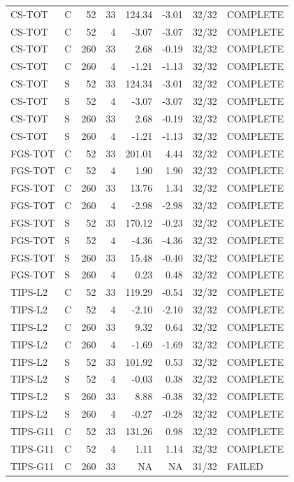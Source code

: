 \documentclass[10pt,a4paper]{article}
\begin{document}
\begin{longtable}{llrrrrrl}
CS-TOT & C & 52 & 33 & 124.34 & -3.01 & 32/32 & COMPLETE \\
CS-TOT & C & 52 & 4 & -3.07 & -3.07 & 32/32 & COMPLETE \\
CS-TOT & C & 260 & 33 & 2.68 & -0.19 & 32/32 & COMPLETE \\
CS-TOT & C & 260 & 4 & -1.21 & -1.13 & 32/32 & COMPLETE \\
CS-TOT & S & 52 & 33 & 124.34 & -3.01 & 32/32 & COMPLETE \\
CS-TOT & S & 52 & 4 & -3.07 & -3.07 & 32/32 & COMPLETE \\
CS-TOT & S & 260 & 33 & 2.68 & -0.19 & 32/32 & COMPLETE \\
CS-TOT & S & 260 & 4 & -1.21 & -1.13 & 32/32 & COMPLETE \\
FGS-TOT & C & 52 & 33 & 201.01 & 4.44 & 32/32 & COMPLETE \\
FGS-TOT & C & 52 & 4 & 1.90 & 1.90 & 32/32 & COMPLETE \\
FGS-TOT & C & 260 & 33 & 13.76 & 1.34 & 32/32 & COMPLETE \\
FGS-TOT & C & 260 & 4 & -2.98 & -2.98 & 32/32 & COMPLETE \\
FGS-TOT & S & 52 & 33 & 170.12 & -0.23 & 32/32 & COMPLETE \\
FGS-TOT & S & 52 & 4 & -4.36 & -4.36 & 32/32 & COMPLETE \\
FGS-TOT & S & 260 & 33 & 15.48 & -0.40 & 32/32 & COMPLETE \\
FGS-TOT & S & 260 & 4 & 0.23 & 0.48 & 32/32 & COMPLETE \\
TIPS-L2 & C & 52 & 33 & 119.29 & -0.54 & 32/32 & COMPLETE \\
TIPS-L2 & C & 52 & 4 & -2.10 & -2.10 & 32/32 & COMPLETE \\
TIPS-L2 & C & 260 & 33 & 9.32 & 0.64 & 32/32 & COMPLETE \\
TIPS-L2 & C & 260 & 4 & -1.69 & -1.69 & 32/32 & COMPLETE \\
TIPS-L2 & S & 52 & 33 & 101.92 & 0.53 & 32/32 & COMPLETE \\
TIPS-L2 & S & 52 & 4 & -0.03 & 0.38 & 32/32 & COMPLETE \\
TIPS-L2 & S & 260 & 33 & 8.88 & -0.38 & 32/32 & COMPLETE \\
TIPS-L2 & S & 260 & 4 & -0.27 & -0.28 & 32/32 & COMPLETE \\
TIPS-G11 & C & 52 & 33 & 131.26 & 0.98 & 32/32 & COMPLETE \\
TIPS-G11 & C & 52 & 4 & 1.11 & 1.14 & 32/32 & COMPLETE \\
TIPS-G11 & C & 260 & 33 & NA & NA & 31/32 & FAILED \\

\end{longtable}
\end{document}
